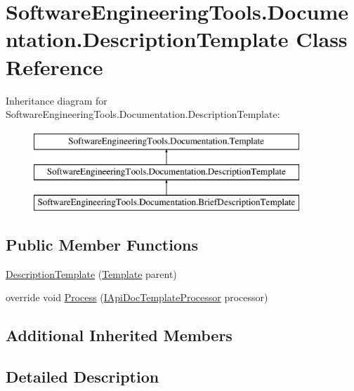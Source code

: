 \hypertarget{class_software_engineering_tools_1_1_documentation_1_1_description_template}{\section{Software\+Engineering\+Tools.\+Documentation.\+Description\+Template Class Reference}
\label{class_software_engineering_tools_1_1_documentation_1_1_description_template}
}
Inheritance diagram for Software\+Engineering\+Tools.\+Documentation.\+Description\+Template\+:\begin{figure}[H]
\begin{center}
\leavevmode
\includegraphics[height=3.000000cm]{class_software_engineering_tools_1_1_documentation_1_1_description_template}
\end{center}
\end{figure}
\subsection*{Public Member Functions}
\begin{DoxyCompactItemize}
\item 
\hyperlink{class_software_engineering_tools_1_1_documentation_1_1_description_template_aaf0d52969f8972fec61e23f8d41871e8}{Description\+Template} (\hyperlink{class_software_engineering_tools_1_1_documentation_1_1_template}{Template} parent)
\item 
override void \hyperlink{class_software_engineering_tools_1_1_documentation_1_1_description_template_aacc8ff3057e26331de9f4f58ae0bc715}{Process} (\hyperlink{interface_software_engineering_tools_1_1_documentation_1_1_i_api_doc_template_processor}{I\+Api\+Doc\+Template\+Processor} processor)
\end{DoxyCompactItemize}
\subsection*{Additional Inherited Members}


\subsection{Detailed Description}


